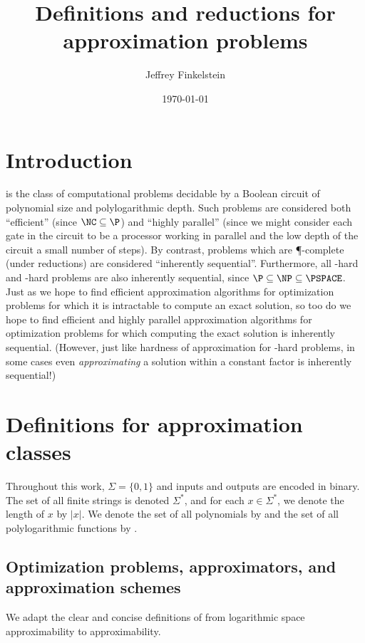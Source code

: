 \documentclass[]{article}
\author{Jef{}frey Finkelstein}
\date{\today}
\title{Definitions and reductions for \texorpdfstring{\NC}{NC} approximation problems}
\theoremstyle{plain}
\theoremstyle{definition}
\begin{document}
\maketitle

\section{Introduction}

\NC{} is the class of computational problems decidable by a Boolean circuit of polynomial size and polylogarithmic depth.
Such problems are considered both ``efficient'' (since $\NC\subseteq\P$) and ``highly parallel'' (since we might consider each gate in the circuit to be a processor working in parallel and the low depth of the circuit a small number of steps).
By contrast, problems which are \P-complete (under \NC{} reductions) are considered ``inherently sequential''.
Furthermore, all \NP-hard and \PSPACE-hard problems are also inherently sequential, since $\P\subseteq\NP\subseteq\PSPACE$.
Just as we hope to find efficient approximation algorithms for optimization problems for which it is intractable to compute an exact solution, so too do we hope to find efficient and highly parallel approximation algorithms for optimization problems for which computing the exact solution is inherently sequential.
(However, just like hardness of approximation for \NP-hard problems, in some cases even \emph{approximating} a solution within a constant factor is inherently sequential!)

\section{Definitions for \texorpdfstring{\NC}{NC} approximation classes}

Throughout this work, $\Sigma=\{0, 1\}$ and inputs and outputs are encoded in binary.
The set of all finite strings is denoted $\Sigma^*$, and for each $x\in\Sigma^*$, we denote the length of $x$ by $|x|$.
We denote the set of all polynomials by \poly{} and the set of all polylogarithmic functions by \polylog.

\subsection{Optimization problems, approximators, and approximation schemes}

We adapt the clear and concise definitions of \cite{tantau07} from logarithmic space approximability to \NC{} approximability.
\end{document}
